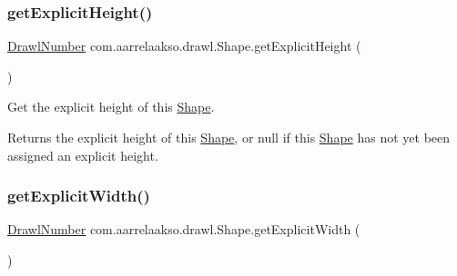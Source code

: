 \mbox{\label{classcom_1_1aarrelaakso_1_1drawl_1_1_shape_a76cd6b4d9f427f1888fc98fd653ee496}} 
\subsubsection{\texorpdfstring{get\+Explicit\+Height()}{getExplicitHeight()}}
{\footnotesize\ttfamily \hyperlink{classcom_1_1aarrelaakso_1_1drawl_1_1_drawl_number}{Drawl\+Number} com.\+aarrelaakso.\+drawl.\+Shape.\+get\+Explicit\+Height (\begin{DoxyParamCaption}{ }\end{DoxyParamCaption})\hspace{0.3cm}{\ttfamily [protected]}}



Get the explicit height of this \hyperlink{classcom_1_1aarrelaakso_1_1drawl_1_1_shape}{Shape}. 

\begin{DoxyReturn}{Returns}
the explicit height of this \hyperlink{classcom_1_1aarrelaakso_1_1drawl_1_1_shape}{Shape}, or {\ttfamily null} if this \hyperlink{classcom_1_1aarrelaakso_1_1drawl_1_1_shape}{Shape} has not yet been assigned an explicit height. 
\end{DoxyReturn}
\mbox{\label{classcom_1_1aarrelaakso_1_1drawl_1_1_shape_aabb6ac3a04620e1c760bcea54797cba8}} 
\subsubsection{\texorpdfstring{get\+Explicit\+Width()}{getExplicitWidth()}}
{\footnotesize\ttfamily \hyperlink{classcom_1_1aarrelaakso_1_1drawl_1_1_drawl_number}{Drawl\+Number} com.\+aarrelaakso.\+drawl.\+Shape.\+get\+Explicit\+Width (\begin{DoxyParamCaption}{ }\end{DoxyParamCaption})\hspace{0.3cm}{\ttfamily [protected]}}



